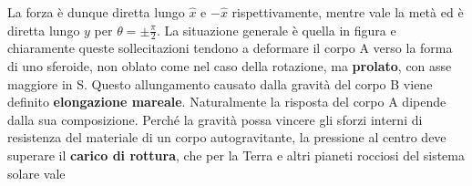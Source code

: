\documentclass[a4paper, oneside]{book}
\begin{document}
\begin{figure}
    \centering
\end{figure} \noindent
La forza è dunque diretta lungo $\hat{x}$ e $-\hat{x}$ rispettivamente, mentre vale la metà ed 
è diretta lungo $y$ per $\theta = \pm \frac{\pi}{2}$. La situazione generale è 
quella in figura e chiaramente queste sollecitazioni tendono a deformare il corpo A 
verso la forma di uno sferoide, non oblato come 
nel caso della rotazione, ma \textbf{prolato}, con asse maggiore in S. 
Questo allungamento causato dalla gravità del corpo B viene definito \textbf{elongazione mareale}.
Naturalmente la risposta del corpo A dipende dalla sua composizione. Perché la gravità possa vincere gli sforzi 
interni di resistenza del materiale di un corpo autogravitante, 
la pressione al centro deve superare il \textbf{carico di rottura}, che 
per la Terra e altri pianeti rocciosi del sistema solare vale 
\end{document}
